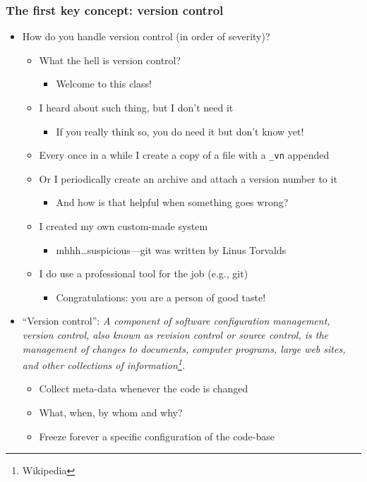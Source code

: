 \documentclass[9pt]{beamer}
\begin{document}
\begin{frame}
  \frametitle{The first key concept: version control}
  \begin{itemize}
  \item How do you handle version control (in order of severity)?
    \begin{itemize}
    \item What the hell is version control?
      \begin{itemize}
      \item \alert{Welcome to this class!}
      \end{itemize}
    \item I heard about such thing, but I don't need it
      \begin{itemize}
      \item \alert{If you really think so, you do need it but don't know yet!}
      \end{itemize}
    \item Every once in a while I create a copy of a file with a \texttt{\_vn}
      appended
    \item Or I periodically create an archive and attach a version number to it
      \begin{itemize}
      \item \alert{And how is that helpful when something goes wrong?}
      \end{itemize}
    \item I created my own custom-made system
      \begin{itemize}
      \item \alert{mhhh\ldots suspicious---git was written by Linus Torvalds}
      \end{itemize}
    \item I do use a professional tool for the job (e.g., git)
      \begin{itemize}
      \item \alert{Congratulations: you are a person of good taste!}
      \end{itemize}
    \end{itemize}
  \item ``Version control'': \emph{A component of software configuration management, version control, also known as revision control or source control, is the management of changes to documents, computer programs, large web sites, and other collections of information\footnote{Wikipedia}.}
    \begin{itemize}
    \item Collect meta-data whenever the code is changed
    \item What, when, by whom and why?
    \item Freeze forever a specific configuration of the code-base
    \end{itemize}
  \end{itemize}
\end{frame}
\end{document}
